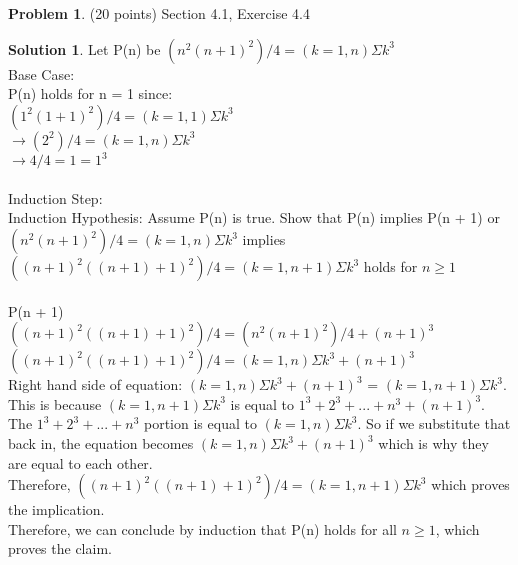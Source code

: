 \documentclass{article}
\theoremstyle{definition}
\newtheorem{problem}{Problem}
\newtheorem*{solution}{Solution}
\begin{document}
\begin{problem} (20 points) Section 4.1, Exercise 4.4
\end{problem}
\begin{solution} 
Let P(n) be $(n^2(n + 1)^2) / 4 = (k = 1, n)\Sigma k^3$ \\
Base Case: \\
P(n) holds for n = 1 since: \\
$(1^2(1 + 1)^2) / 4 = (k = 1, 1)\Sigma k^3$ \\
$\to (2^2) / 4 = (k = 1, n)\Sigma k^3$ \\
$\to 4 / 4 = 1 = 1^3$ \\
\\
Induction Step: \\
Induction Hypothesis: Assume P(n) is true. Show that P(n) implies P(n + 1) or $(n^2(n + 1)^2) / 4 = (k = 1, n)\Sigma k^3$ implies $((n + 1)^2((n + 1) + 1)^2) / 4 = (k = 1, n + 1)\Sigma k^3$ holds for $n \geqslant 1$ \\
\\
P(n + 1) \\
$((n + 1)^2((n + 1) + 1)^2) / 4 = (n^2(n + 1)^2) / 4 + (n + 1)^3$\\
$((n + 1)^2((n + 1) + 1)^2) / 4 = (k = 1, n)\Sigma k^3 + (n + 1)^3$\\
Right hand side of equation: $(k = 1, n)\Sigma k^3 + (n + 1)^3$ = $(k = 1, n + 1)\Sigma k^3$. This is because $(k = 1, n + 1)\Sigma k^3$ is equal to $1^3 + 2^3 + ... + n^3 + (n+1)^3$. The $1^3 + 2^3 + ... + n^3$ portion is equal to $(k = 1, n)\Sigma k^3$. So if we substitute that back in, the equation becomes $(k = 1, n)\Sigma k^3 + (n + 1)^3$ which is why they are equal to each other.\\
Therefore, $((n + 1)^2((n + 1) + 1)^2) / 4 = (k = 1, n + 1)\Sigma k^3$ which proves the implication. \\
Therefore, we can conclude by induction that P(n) holds for all $n \geqslant 1$, which proves the claim.
\end{solution}
\end{document}
